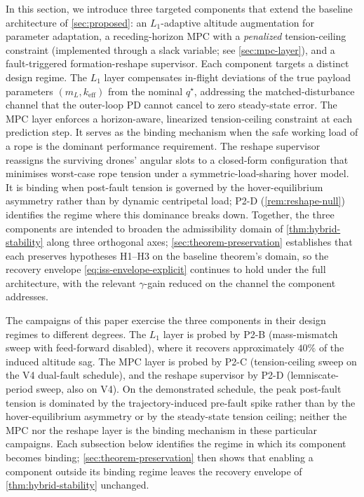 In this section, we introduce three targeted components that extend the baseline architecture of \cref{sec:proposed}: an $L_1$-adaptive altitude augmentation for parameter adaptation, a receding-horizon MPC with a \emph{penalized} tension-ceiling constraint (implemented through a slack variable; see \cref{sec:mpc-layer}), and a fault-triggered formation-reshape supervisor. Each component targets a distinct design regime. The $L_1$ layer compensates in-flight deviations of the true payload parameters $(m_L, k_{\mathrm{eff}})$ from the nominal $q^\star$, addressing the matched-disturbance channel that the outer-loop PD cannot cancel to zero steady-state error. The MPC layer enforces a horizon-aware, linearized tension-ceiling constraint at each prediction step. It serves as the binding mechanism when the safe working load of a rope is the dominant performance requirement. The reshape supervisor reassigns the surviving drones' angular slots to a closed-form configuration that minimises worst-case rope tension under a symmetric-load-sharing hover model. It is binding when post-fault tension is governed by the hover-equilibrium asymmetry rather than by dynamic centripetal load; P2-D (\cref{rem:reshape-null}) identifies the regime where this dominance breaks down. Together, the three components are intended to broaden the admissibility domain of \cref{thm:hybrid-stability} along three orthogonal axes; \cref{sec:theorem-preservation} establishes that each preserves hypotheses H1--H3 on the baseline theorem's domain, so the recovery envelope \eqref{eq:iss-envelope-explicit} continues to hold under the full architecture, with the relevant $\gamma$-gain reduced on the channel the component addresses.

The campaigns of this paper exercise the three components in their design regimes to different degrees. The $L_1$ layer is probed by P2-B (mass-mismatch sweep with feed-forward disabled), where it recovers approximately $40\%$ of the induced altitude sag. The MPC layer is probed by P2-C (tension-ceiling sweep on the V4 dual-fault schedule), and the reshape supervisor by P2-D (lemniscate-period sweep, also on V4). On the demonstrated schedule, the peak post-fault tension is dominated by the trajectory-induced pre-fault spike rather than by the hover-equilibrium asymmetry or by the steady-state tension ceiling; neither the MPC nor the reshape layer is the binding mechanism in these particular campaigns. Each subsection below identifies the regime in which its component becomes binding; \cref{sec:theorem-preservation} then shows that enabling a component outside its binding regime leaves the recovery envelope of \cref{thm:hybrid-stability} unchanged.

